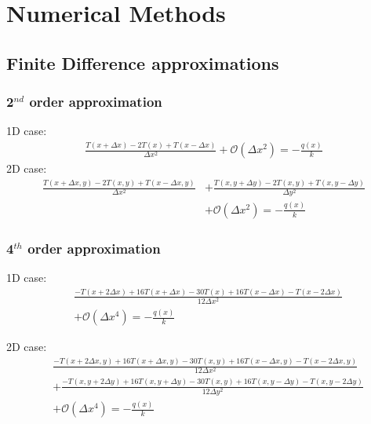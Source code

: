 \section{Numerical Methods}
\subsection{Finite Difference approximations}
\subsubsection{2$^{nd}$ order approximation}
1D case:
\begin{equation}
\begin{split}
    \frac{T(x+\Delta x) - 2T(x) + T(x-\Delta x)}{\Delta x^2}
    +\mathcal{O}(\Delta x^2)= -\frac{q(x)}{k}
\end{split}
\end{equation}
2D case:
\begin{equation}
\begin{split}
    \frac{T(x+\Delta x, y) - 2T(x,y) + T(x-\Delta x, y)}{\Delta x^2} & +\frac{T(x, y+\Delta y) - 2T(x,y) + T(x, y-\Delta y)}{\Delta y^2} \\
    & +\mathcal{O}(\Delta x^2)= -\frac{q(x)}{k}
\end{split}
\end{equation}

\subsubsection{4$^{th}$ order approximation}

1D case:
\begin{equation}
    \begin{split}
    &\frac{-T(x+2\Delta x) + 16T(x+\Delta x) -30T(x) +16T(x-\Delta x) -T(x-2\Delta x)}{12\Delta x^2}\\
    & +\mathcal{O}(\Delta x^4) = -\frac{q(x)}{k} 
\end{split} 
\end{equation}

2D case:
\begin{equation}
    \begin{split}
    &\frac{-T(x+2\Delta x, y) + 16T(x+\Delta x, y) -30T(x,y) +16T(x-\Delta x, y) -T(x-2\Delta x, y)}{12\Delta x^2} \\
    &+\frac{-T(x, y+2\Delta y) + 16T(x, y+\Delta y) -30T(x,y) +16T(x, y-\Delta y) -T(x, y-2\Delta y)}{12\Delta y^2}\\
    & +\mathcal{O}(\Delta x^4) = -\frac{q(x)}{k} 
\end{split}
\end{equation}


